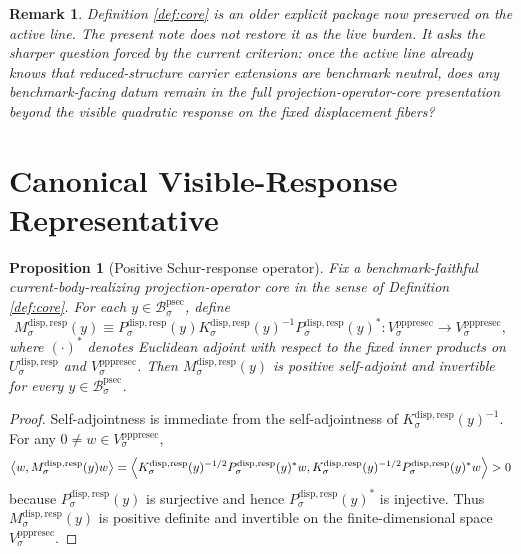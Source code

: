 \documentclass[11pt]{article}
\newcommand{\ProtoSectionBody}[1]{\mathcal B_{#1}^{\mathrm{psec}}}
\newcommand{\PrePreProtoSectionVertical}[1]{V_{#1}^{\mathrm{pppresec}}}
\newcommand{\SubstrateCarrier}[1]{U_{#1}^{\mathrm{disp,resp}}}
\newcommand{\SubstrateProjection}[1]{P_{#1}^{\mathrm{disp,resp}}}
\newcommand{\SubstrateOperator}[1]{K_{#1}^{\mathrm{disp,resp}}}
\newcommand{\SchurResponse}[1]{M_{#1}^{\mathrm{disp,resp}}}
\newtheorem{proposition}{Proposition}
\newtheorem{remark}{Remark}
\begin{document}
\begin{remark}
Definition \ref{def:core} is an older explicit package now preserved on the active line. The present note does not restore it as the live burden. It asks the sharper question forced by the current criterion: once the active line already knows that reduced-structure carrier extensions are benchmark neutral, does any benchmark-facing datum remain in the full projection-operator-core presentation beyond the visible quadratic response on the fixed displacement fibers?
\end{remark}

\section{Canonical Visible-Response Representative}

\begin{proposition}[Positive Schur-response operator]
\label{prop:schur}
Fix a benchmark-faithful current-body-realizing projection-operator core in the sense of Definition \ref{def:core}. For each \(y\in\ProtoSectionBody{\sigma}\), define
\[
\SchurResponse{\sigma}(y)
\equiv
\SubstrateProjection{\sigma}(y)
\SubstrateOperator{\sigma}(y)^{-1}
\SubstrateProjection{\sigma}(y)^*:
\PrePreProtoSectionVertical{\sigma}\to\PrePreProtoSectionVertical{\sigma},
\]
where \((\cdot)^*\) denotes Euclidean adjoint with respect to the fixed inner products on \(\SubstrateCarrier{\sigma}\) and \(\PrePreProtoSectionVertical{\sigma}\). Then \(\SchurResponse{\sigma}(y)\) is positive self-adjoint and invertible for every \(y\in\ProtoSectionBody{\sigma}\).
\end{proposition}

\begin{proof}
Self-adjointness is immediate from the self-adjointness of \(\SubstrateOperator{\sigma}(y)^{-1}\). For any \(0\neq w\in\PrePreProtoSectionVertical{\sigma}\),
\[
\ev{w,\SchurResponse{\sigma}(y)w}
=
\ev{
\SubstrateOperator{\sigma}(y)^{-1/2}\SubstrateProjection{\sigma}(y)^*w,
\SubstrateOperator{\sigma}(y)^{-1/2}\SubstrateProjection{\sigma}(y)^*w
}
>0
\]
because \(\SubstrateProjection{\sigma}(y)\) is surjective and hence \(\SubstrateProjection{\sigma}(y)^*\) is injective. Thus \(\SchurResponse{\sigma}(y)\) is positive definite and invertible on the finite-dimensional space \(\PrePreProtoSectionVertical{\sigma}\).
\end{proof}
\end{document}
